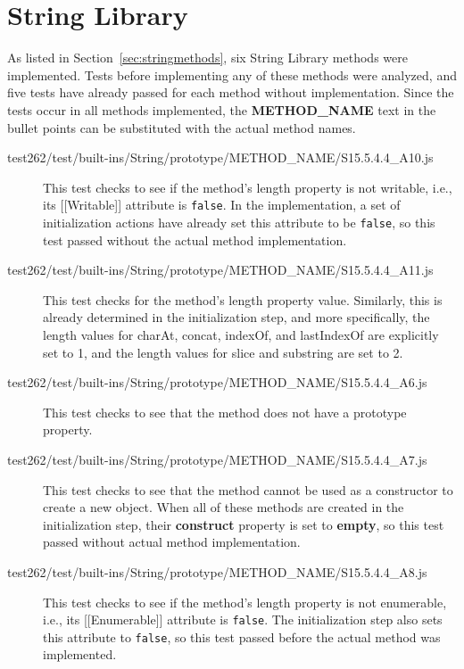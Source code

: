\documentclass[a4paper,11pt,twoside]{report}
\begin{document}
\section{String Library}
As listed in Section~\ref{sec:stringmethods}, six String Library methods were implemented. Tests before implementing any of these methods were analyzed, and five tests have already passed for each method without implementation. Since the tests occur in all methods implemented, the \textbf{METHOD\_NAME} text in the bullet points can be substituted with the actual method names.

\begin{description}
\item[test262/test/built-ins/String/prototype/METHOD\_NAME/S15.5.4.4\_A10.js] This test checks to see if the method's length property is not writable, i.e., its [[Writable]] attribute is \texttt{false}. In the implementation, a set of initialization actions have already set this attribute to be \texttt{false}, so this test passed without the actual method implementation.

\item[test262/test/built-ins/String/prototype/METHOD\_NAME/S15.5.4.4\_A11.js] This test checks for the method's length property value. Similarly, this is already determined in the initialization step, and more specifically, the length values for charAt, concat, indexOf, and lastIndexOf are explicitly set to 1, and the length values for slice and substring are set to 2.

\item[test262/test/built-ins/String/prototype/METHOD\_NAME/S15.5.4.4\_A6.js] This test checks to see that the method does not have a prototype property.

\item[test262/test/built-ins/String/prototype/METHOD\_NAME/S15.5.4.4\_A7.js] This test checks to see that the method cannot be used as a constructor to create a new object. When all of these methods are created in the initialization step, their \textbf{construct} property is set to \textbf{empty}, so this test passed without actual method implementation.

\item[test262/test/built-ins/String/prototype/METHOD\_NAME/S15.5.4.4\_A8.js] This test checks to see if the method's length property is not enumerable, i.e., its [[Enumerable]] attribute is \texttt{false}. The initialization step also sets this attribute to \texttt{false}, so this test passed before the actual method was implemented.
\end{description}
\end{document}
